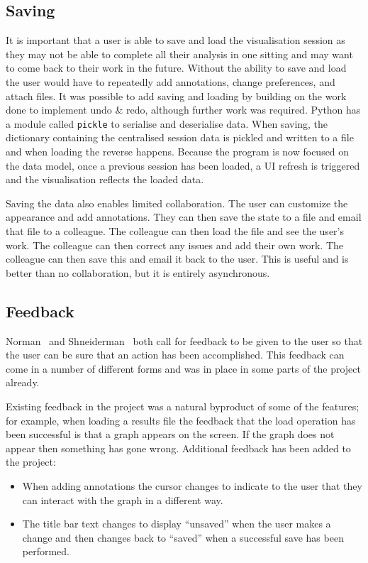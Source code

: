 \subsection{Saving}

It is important that a user is able to save and load the visualisation session as they may not be able to complete all their analysis in one sitting and may want to come back to their work in the future.  Without the ability to save and load the user would have to repeatedly add annotations, change preferences, and attach files.  It was possible to add saving and loading by building on the work done to implement undo \& redo, although further work was required. Python has a module called \texttt{pickle} to serialise and deserialise data.  When saving, the dictionary containing the centralised session data is pickled and written to a file and when loading the reverse happens.  Because the program is now focused on the data model, once a previous session has been loaded, a \ac{UI} refresh is triggered and the visualisation reflects the loaded data.

Saving the data also enables limited collaboration.  The user can customize the appearance and add annotations.  They can then save the state to a file and email that file to a colleague.  The colleague can then load the file and see the user's work.  The colleague can then correct any issues and add their own work.  The colleague can then save this and email it back to the user.  This is useful and is better than no collaboration, but it is entirely asynchronous.

\subsection{Feedback}
\label{sec:feedback}
Norman~\cite{normsev} and Shneiderman~\cite{shgold} both call for feedback to be given to the user so that the user can be sure that an action has been accomplished.  This feedback can come in a number of different forms and was in place in some parts of the project already.

Existing feedback in the project was a natural byproduct of some of the features; for example, when loading a results file the feedback that the load operation has been successful is that a graph appears on the screen. If the graph does not appear then something has gone wrong.  Additional feedback has been added to the project:
\begin{itemize}
\item When adding annotations the cursor changes to indicate to the user that they can interact with the graph in a different way.
\item The title bar text changes to display ``unsaved'' when the user makes a change and then changes back to ``saved'' when a successful save has been performed.
\end{itemize}


